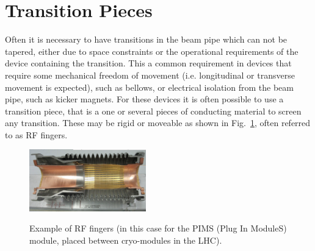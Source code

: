 \section{Transition Pieces}
\label{sec:transitions}

Often it is necessary to have transitions in the beam pipe which can not be tapered, either due to space constraints or the operational requirements of the device containing the transition. This a common requirement in devices that require some mechanical freedom of movement (i.e. longitudinal or transverse movement is expected), such as bellows, or electrical isolation from the beam pipe, such as kicker magnets. For these devices it is often possible to use a transition piece, that is a one or several pieces of conducting material to screen any transition. These may be rigid or moveable as shown in Fig.~\ref{fig:rf_fingers}, often referred to as RF fingers.

\begin{figure}
\begin{center}
\includegraphics[width=0.45\textwidth]{Beam_Coupling_Impedance_Reduction_Techniques/figures/pimsImage.png}
\label{fig:rf_fingers}
\end{center}
\caption{Example of RF fingers (in this case for the PIMS (Plug In ModuleS) module, placed between cryo-modules in the LHC).}
\end{figure}


